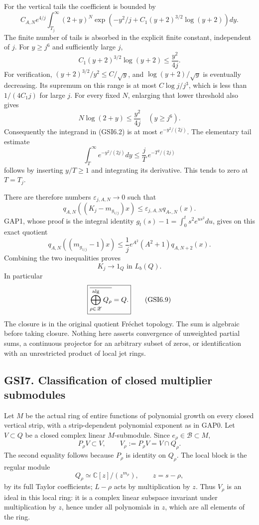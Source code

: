 For the vertical tails the coefficient is bounded by \[
C_{A,N}e^{4/j}\int_{T_j}^{\infty}
(2+y)^N\exp\left(-y^2/j+C_1(y+2)^{3/2}\log(y+2)\right)dy.
\tag{GSI6.2}
\] The finite number of tails is absorbed in the explicit finite
constant, independent of \(j\). For \(y\ge j^6\) and sufficiently large
\(j\), \[
C_1(y+2)^{3/2}\log(y+2)\le\frac{y^2}{4j}.
\tag{GSI6.3}
\] For verification, \((y+2)^{3/2}/y^2\le C/\sqrt y\), and
\(\log(y+2)/\sqrt y\) is eventually decreasing. Its supremum on this
range is at most \(C\log j/j^3\), which is less than \(1/(4C_1j)\) for
large \(j\). For every fixed \(N\), enlarging that lower threshold also
gives \[
N\log(2+y)\le\frac{y^2}{4j}\quad(y\ge j^6).
\tag{GSI6.4}
\] Consequently the integrand in (GSI6.2) is at most \(e^{-y^2/(2j)}\).
The elementary tail estimate \[
\int_T^\infty e^{-y^2/(2j)}dy
\le\frac jT\,e^{-T^2/(2j)}
\tag{GSI6.5}
\] follows by inserting \(y/T\ge1\) and integrating its derivative. This
tends to zero at \(T=T_j\).

There are therefore numbers \(\varepsilon_{j,A,N}\to0\) such that \[
q_{A,N}((K_j-m_{g_{1/j}})x)
\le\varepsilon_{j,A,N}q_{A_*,N}(x).
\tag{GSI6.6}
\] GAP1, whose proof is the integral identity
\(g_t(s)-1=\int_0^t s^2e^{us^2}du\), gives on this exact quotient \[
q_{A,N}((m_{g_{1/j}}-1)x)
\le\frac1j e^{A^2}(A^2+1)q_{A,N+2}(x).
\tag{GSI6.7}
\] Combining the two inequalities proves \[
\boxed{K_j\longrightarrow1_Q\text{ in }L_b(Q).}
\tag{GSI6.8}
\] In particular \[
\boxed{\overline{\bigoplus_{\rho\in\mathscr Z}^{\rm alg}Q_\rho}=Q.}
\tag{GSI6.9}
\] The closure is in the original quotient Fréchet topology. The sum is
algebraic before taking closure. Nothing here asserts convergence of
unweighted partial sums, a continuous projector for an arbitrary subset
of zeros, or identification with an unrestricted product of local jet
rings.

\subsection{GSI7. Classification of closed multiplier
submodules}\label{gsi7.-classification-of-closed-multiplier-submodules}

Let \(M\) be the actual ring of entire functions of polynomial growth on
every closed vertical strip, with a strip-dependent polynomial exponent
as in GAP0. Let \(V\subset Q\) be a closed complex linear
\(M\)-submodule. Since \(e_\rho\in\mathcal B\subset M\), \[
P_\rho V\subset V,\qquad
V_\rho:=P_\rho V=V\cap Q_\rho.
\tag{GSI7.1}
\] The second equality follows because \(P_\rho\) is identity on
\(Q_\rho\). The local block is the regular module \[
Q_\rho\simeq\mathbb C[z]/(z^{m_\rho}),\qquad z=s-\rho,
\tag{GSI7.2}
\] by its full Taylor coefficients; \(L-\rho\) acts by multiplication by
\(z\). Thus \(V_\rho\) is an ideal in this local ring: it is a complex
linear subspace invariant under multiplication by \(z\), hence under all
polynomials in \(z\), which are all elements of the ring.

